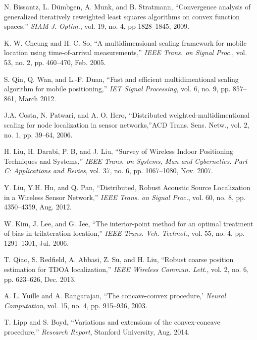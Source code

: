 \begin{thebibliography}{99}
N. Bissantz, L. D\"umbgen, A. Munk, and B.  Stratmann, ``Convergence analysis of generalized iteratively reweighted least squares algorithms on convex function spaces,'' {\em SIAM J. Optim.}, vol. 19, no. 4, pp 1828--1845, 2009.



K. W. Cheung and H. C. So, ``A multidimensional scaling framework for mobile location using time-of-arrival measurements,'' {\em IEEE Trans. on Signal Proc.}, vol. 53, no. 2, pp. 460--470, Feb. 2005.

S. Qin, Q. Wan, and L.-F. Duan, ``Fast and efficient multidimentional scaling algorithm for mobile positioning,'' {\em IET Signal Processing}, vol. 6, no. 9, pp. 857--861, March 2012.

J.A. Costa, N. Patwari, and A. O. Hero, ``Distributed weighted-multidimentional scaling for node localization in sensor networks,''ACD Trans. Sens. Netw., vol. 2, no. 1, pp. 39--64, 2006. 

H. Liu, H. Darabi, P. B, and J. Liu, ``Survey of Wireless Indoor Positioning Techniques and Systems,'' {\em IEEE Trans. on Systems, Man and Cybernetics. Part C: Applications and Revies}, vol. 37, no. 6, pp. 1067--1080, Nov. 2007.

Y. Liu, Y.H. Hu, and Q. Pan, ``Distributed, Robust Acoustic Source Localization in a Wireless Sensor Network,'' {\em IEEE Trans. on Signal Proc.}, vol. 60, no. 8, pp. 4350--4359, Aug. 2012.

W. Kim, J. Lee, and G. Jee, ``The interior-point method for an optimal treatment of bias in trilateration location,'' {\em IEEE Trans. Veh. Technol.}, vol. 55, no. 4, pp. 1291--1301, Jul. 2006.

T. Qiao, S. Redfield, A. Abbasi, Z. Su, and H. Liu, ``Robust coarse position estimation for TDOA localization,'' {\em IEEE Wireless Commun. Lett.}, vol. 2, no. 6, pp. 623--626, Dec. 2013.

A. L. Yuille and A. Rangarajan, ``The concave-convex procedure,' {\em Neural Computation}, vol. 15, no. 4, pp. 915--936, 2003.

T. Lipp and S. Boyd, ``Variations and extensions of the convex-concave procedure,'' {\em Research Report}, Stanford University, Aug. 2014.


\end{thebibliography}
